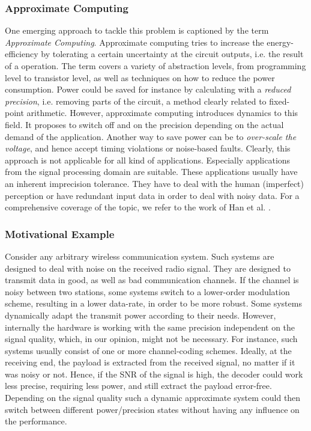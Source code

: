 \documentclass[conference]{IEEEtran}
\begin{document}
\subsubsection*{Approximate Computing}
One emerging approach to tackle this problem is captioned by the term \emph{Approximate Computing}. Approximate computing tries to increase the energy-efficiency by tolerating a certain uncertainty at the circuit outputs, i.e. the result of a operation. The term covers a variety of abstraction levels, from programming level to transistor level, as well as techniques on how to reduce the power consumption. Power could be saved for instance by calculating with a \emph{reduced precision}, i.e. removing parts of the circuit, a method clearly related to fixed-point arithmetic. However, approximate computing introduces dynamics to this field. It proposes to switch off and on the precision depending on the actual demand of the application. Another way to save power can be to \emph{over-scale the voltage}, and hence accept timing violations or noise-based faults. 
Clearly, this approach is not applicable for all kind of applications. Especially applications from the signal processing domain are suitable. These applications usually have an inherent imprecision tolerance. They have to deal with the human (imperfect) perception or have redundant input data in order to deal with noisy data. For a comprehensive coverage of the topic, we refer to the work of Han et al. \cite{han_approximate_2013}.
\subsubsection*{Motivational Example}
Consider any arbitrary wireless communication system. Such systems are designed to deal with noise on the received radio signal. They are designed to transmit data in good, as well as bad communication channels. If the channel is noisy between two stations, some systems switch to a lower-order modulation scheme, resulting in a lower data-rate, in order to be more robust. Some systems dynamically adapt the transmit power according to their needs. However, internally the hardware is working with the same precision independent on the signal quality, which, in our opinion, might not be necessary. For instance, such systems usually consist of one or more channel-coding schemes. Ideally, at the receiving end, the payload is extracted from the received signal, no matter if it was noisy or not. Hence, if the SNR of the signal is high, the decoder could work less precise, requiring less power, and still extract the payload error-free. Depending on the signal quality such a dynamic approximate system could then switch between different power/precision states without having any influence on the performance.
\end{document}
